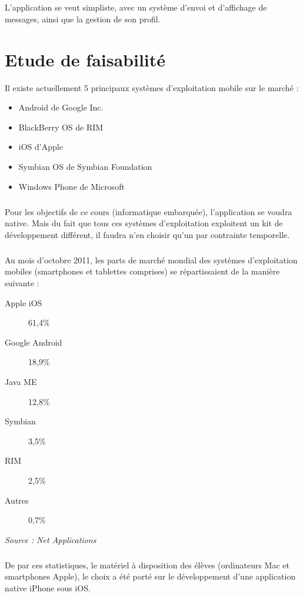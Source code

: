 \documentclass[a4paper,12pt]{report}
\begin{document}
\begin{onehalfspace}
  \paragraph*{}
  L'application se veut simpliste, avec un système d'envoi et d'affichage de messages, ainsi que la gestion de son profil.

  \chapter*{Etude de faisabilité}
  Il existe actuellement 5 principaux systèmes d'exploitation mobile sur le marché :
  \begin{itemize}
    \item Android de Google Inc.
    \item BlackBerry OS de RIM
    \item iOS d'Apple
    \item Symbian OS de Symbian Foundation
    \item Windows Phone de Microsoft
  \end{itemize}

  \paragraph*{}
  Pour les objectifs de ce cours (informatique embarquée), l'application se voudra native. Mais du fait que tous ces systèmes d'exploitation exploitent un kit de développement différent, il faudra n'en choisir qu'un par contrainte temporelle.

  \paragraph*{}
  Au mois d'octobre 2011, les parts de marché mondial des systèmes d'exploitation mobiles (smartphones et tablettes comprises) se répartissaient de la manière suivante :
  \begin{description}
    \item[Apple iOS] 61,4\%
    \item[Google Android] 18,9\%
    \item[Java ME] 12,8\%
    \item[Symbian] 3,5\%
    \item[RIM] 2,5\%
    \item[Autres] 0,7\%
  \end{description}
  \emph{Source : Net Applications}

  \paragraph*{}
  De par ces statistiques, le matériel à disposition des élèves (ordinateurs Mac et smartphones Apple), le choix a été porté sur le développement d'une application native iPhone sous iOS.


\end{onehalfspace}
\end{document}
